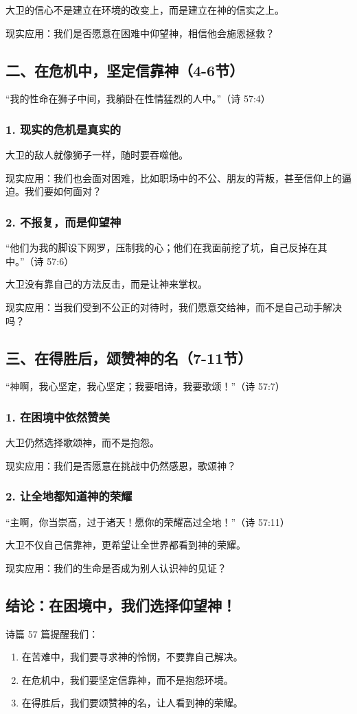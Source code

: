 \documentclass[a4paper, 12pt]{article}
\begin{document}
大卫的信心不是建立在环境的改变上，而是建立在神的信实之上。

现实应用：我们是否愿意在困难中仰望神，相信他会施恩拯救？
\subsection*{二、在危机中，坚定信靠神（4-6节）}
“我的性命在狮子中间，我躺卧在性情猛烈的人中。”（诗 57:4）

\subsubsection*{1. 现实的危机是真实的}
\hspace{0.6cm}大卫的敌人就像狮子一样，随时要吞噬他。

现实应用：我们也会面对困难，比如职场中的不公、朋友的背叛，甚至信仰上的逼迫。我们要如何面对？
\subsubsection*{2. 不报复，而是仰望神}
“他们为我的脚设下网罗，压制我的心；他们在我面前挖了坑，自己反掉在其中。”（诗 57:6）

大卫没有靠自己的方法反击，而是让神来掌权。

现实应用：当我们受到不公正的对待时，我们愿意交给神，而不是自己动手解决吗？
\subsection*{三、在得胜后，颂赞神的名（7-11节）}
“神啊，我心坚定，我心坚定；我要唱诗，我要歌颂！”（诗 57:7）

\subsubsection*{1. 在困境中依然赞美}
\hspace{0.6cm}大卫仍然选择歌颂神，而不是抱怨。

现实应用：我们是否愿意在挑战中仍然感恩，歌颂神？
\subsubsection*{2. 让全地都知道神的荣耀}
“主啊，你当崇高，过于诸天！愿你的荣耀高过全地！”（诗 57:11）

大卫不仅自己信靠神，更希望让全世界都看到神的荣耀。

现实应用：我们的生命是否成为别人认识神的见证？
\subsection*{结论：在困境中，我们选择仰望神！}
诗篇 57 篇提醒我们：
\begin{enumerate}
    \item 在苦难中，我们要寻求神的怜悯，不要靠自己解决。

    \item 在危机中，我们要坚定信靠神，而不是抱怨环境。

    \item 在得胜后，我们要颂赞神的名，让人看到神的荣耀。

\end{enumerate}
\end{document}
